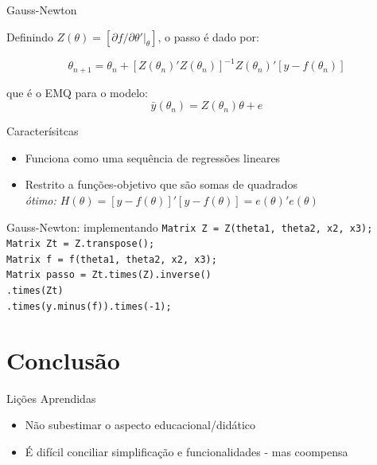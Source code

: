 \documentclass{beamer}
\begin{document}
\begin{frame}{Gauss-Newton}


Definindo $ Z(\theta)=[\partial f/ \partial \theta'\vert_{\theta}] $, o passo é dado por:

\[ \theta_{n+1} = \theta_{n} + [Z(\theta_n)'Z(\theta_n)]^{-1}Z(\theta_n)'[y-f(\theta_n)] \]

que é o EMQ para o modelo:
\[ \bar{y}(\theta_n)=Z(\theta_n)\theta+e \]

\begin{block}{Caracterísitcas}
\begin{itemize}
	\item{Funciona como uma sequência de regressões lineares}
	\item{Restrito a funções-objetivo que são somas de quadrados
		\\\textit{ótimo: $ H(\theta) = [y - f(\theta)]'[y - f(\theta)] = e(\theta)'e(\theta) $}}
\end{itemize}
\end{block}
		
\end{frame}

\begin{frame}{Gauss-Newton: implementando}
\small{\texttt{Matrix Z = Z(theta1, theta2, x2, x3); \\
Matrix Zt = Z.transpose(); \\
Matrix f = f(theta1, theta2, x2, x3); \\
Matrix passo = Zt.times(Z).inverse()\\\hspace{2pc}.times(Zt)\\\hspace{2pc}.times(y.minus(f)).times(-1); }}
\end{frame}

\begin{frame}
\begin{center}
\end{center}
\end{frame}

\section{Conclusão}

\begin{frame}{Lições Aprendidas}
	\begin{itemize}
		\item Não subestimar o aspecto educacional/didático
		\item É difícil conciliar simplificação e funcionalidades - mas coompensa
	\end{itemize}
\end{frame}
\end{document}
